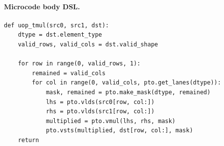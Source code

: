 \paragraph{Microcode body DSL.}
\begin{lstlisting}[style=ptocode]
def uop_tmul(src0, src1, dst):
    dtype = dst.element_type
    valid_rows, valid_cols = dst.valid_shape

    for row in range(0, valid_rows, 1):
        remained = valid_cols
        for col in range(0, valid_cols, pto.get_lanes(dtype)):
            mask, remained = pto.make_mask(dtype, remained)
            lhs = pto.vlds(src0[row, col:])
            rhs = pto.vlds(src1[row, col:])
            multiplied = pto.vmul(lhs, rhs, mask)
            pto.vsts(multiplied, dst[row, col:], mask)
    return
\end{lstlisting}
\Needspace{0.34\textheight}
